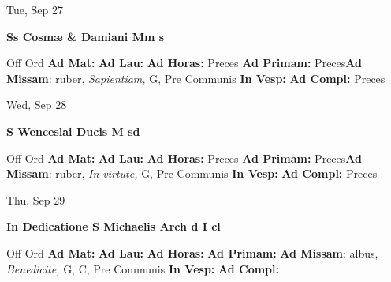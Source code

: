 \documentclass[10pt]{memoir}
\begin{document}
\begin{center}
\begin{minipage}{3.5in}
\vspace{2em}
\begin{center}Tue, Sep 27
\end{center}
\textbf{ \large Ss Cosmæ \& Damiani Mm
\textnormal{\normalsize s}}

\begin{justify}Off Ord
\textbf{Ad Mat: }
\textbf{Ad Lau: }
\textbf{Ad Horas: }Preces
\textbf{Ad Primam: }Preces\textbf{Ad Missam}: ruber, \textit{Sapientiam,} G, Pre Communis
\textbf{In Vesp: }
\textbf{Ad Compl: }Preces
\end{justify}
\end{minipage}
\end{center}

\begin{center}
\begin{minipage}{3.5in}
\vspace{2em}
\begin{center}Wed, Sep 28
\end{center}
\textbf{ \large S Wenceslai Ducis M
\textnormal{\normalsize sd}}

\begin{justify}Off Ord
\textbf{Ad Mat: }
\textbf{Ad Lau: }
\textbf{Ad Horas: }Preces
\textbf{Ad Primam: }Preces\textbf{Ad Missam}: ruber, \textit{In virtute,} G, Pre Communis
\textbf{In Vesp: }
\textbf{Ad Compl: }Preces
\end{justify}
\end{minipage}
\end{center}

\begin{center}
\begin{minipage}{3.5in}
\vspace{2em}
\begin{center}Thu, Sep 29
\end{center}
\textbf{ \large In Dedicatione S Michaelis Arch
\textnormal{\normalsize d I cl}}

\begin{justify}Off Ord
\textbf{Ad Mat: }
\textbf{Ad Lau: }
\textbf{Ad Horas: }
\textbf{Ad Primam: }\textbf{Ad Missam}: albus, \textit{Benedicite,} G, C, Pre Communis
\textbf{In Vesp: }
\textbf{Ad Compl: }
\end{justify}
\end{minipage}
\end{center}
\end{document}

